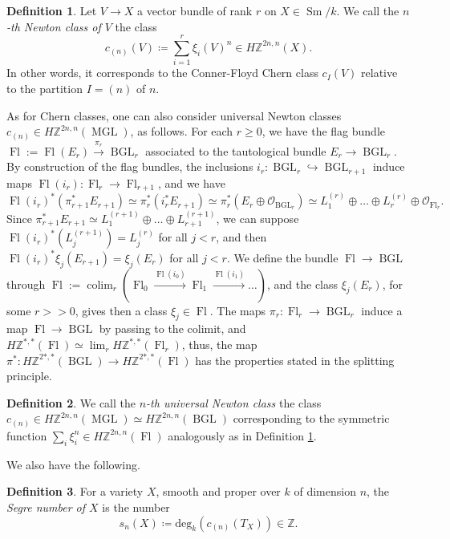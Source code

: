 \documentclass[10pt]{amsart}
\theoremstyle{definition}
\newtheorem{defn}{Definition}[section]
\theoremstyle{plain}
\numberwithin{equation}{section}
\newcommand{\0}{\emptyset}
\newcommand{\Z}{{\mathbb Z}}
\newcommand{\MGL}{{\operatorname{MGL}}}
\newcommand{\BGL}{{\operatorname{BGL}}}
\newcommand{\Sm}{{\operatorname{Sm}}}
\newcommand{\colim}{{\operatorname*{colim}}}
\newcommand{\Fl}{{\operatorname{Fl}}}
\begin{document}
\begin{defn}
\label{defn:NewtonClasses}
    Let $V\to X$ a vector bundle of rank $r$ on $X\in \Sm/k$. We call the \emph{$n$-th Newton class of $V$} the class $$c_{(n)}(V) \coloneqq \sum_{i=1}^{r}\xi_i(V)^n \in H\mathbb{Z}^{2n,n}(X).$$
    In other words, it corresponds to the Conner-Floyd Chern class $c_{I}(V)$ relative to the partition $I=(n)$ of $n$.
\end{defn}

As for Chern classes, one can also consider universal Newton classes $c_{(n)} \in H\Z^{2n,n}(\MGL)$, as follows. For each $r\ge 0$, we have the flag bundle $\Fl :=\Fl(E_r)\xrightarrow{\pi_r} \BGL_r$ associated to the tautological bundle $E_r \to \BGL_r$. By construction of the flag bundles, the inclusions $i_r:\BGL_r \hookrightarrow \BGL_{r+1}$ induce maps $\Fl(i_r):\Fl_r \to \Fl_{r+1}$, and we have
$$\Fl(i_r)^*(\pi_{r+1}^*E_{r+1})\simeq \pi_r^*(i_r^*E_{r+1})\simeq \pi_r^*(E_r \oplus \mathcal{O}_{\BGL_r})\simeq L_1^{(r)} \oplus \ldots \oplus L_r^{(r)} \oplus \mathcal{O}_{\Fl_r}.$$
Since $\pi_{r+1}^*E_{r+1}\simeq L_1^{(r+1)}\oplus \ldots \oplus L_{r+1}^{(r+1)}$, we can suppose $\Fl(i_r)^*(L_j^{(r+1)}) = L_j^{(r)}$ for all $j<r$, and then $\Fl(i_r)^*\xi_j(E_{r+1})=\xi_j(E_r)$ for all $j<r$. We define the bundle $\Fl \to \BGL$ through $\Fl:=\colim_r(\Fl_0 \xrightarrow{\Fl(i_0)} \Fl_1 \xrightarrow{\Fl(i_1)}\ldots)$, and the class $\xi_j(E_r)$, for some $r>>0$, gives then a class $\xi_j \in \Fl$. The maps $\pi_r:\Fl_r \to \BGL_r$ induce a map $\Fl\to \BGL$ by passing to the colimit, and $H\Z^{*,*}(\Fl)\simeq \lim_rH\Z^{*,*}(\Fl_r)$, thus, the map $\pi^*:H\Z^{2*,*}(\BGL)\to H\Z^{2*,*}(\Fl)$ has the properties stated in the splitting principle.

\begin{defn}
\label{defn:univNewtonClasses}
    We call the \emph{$n$-th universal Newton class} the class $c_{(n)} \in H\Z^{2n,n}(\MGL)\simeq H\Z^{2n,n}(\BGL)$ corresponding to the symmetric function $\sum_i \xi_i^n \in H\Z^{2n,n}(\Fl)$ analogously as in Definition \ref{defn:NewtonClasses}.
\end{defn}

We also have the following.

\begin{defn}
\label{defn:SegreNumber}
    For a variety $X$, smooth and proper over $k$ of dimension $n$, the \emph{Segre number of $X$} is the number
    $$s_n(X) \coloneqq \text{deg}_k(c_{(n)}(T_X)) \in \mathbb{Z}.$$
\end{defn}
\end{document}

